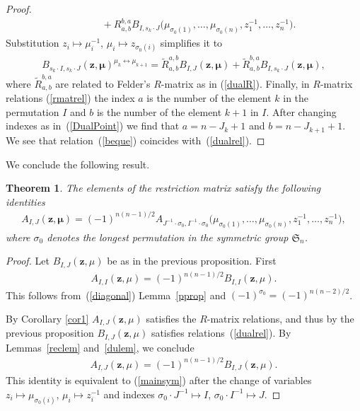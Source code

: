 \documentclass[pdftex]{sigma}
\def\zz{{\boldsymbol z}}
\def\mub{{\boldsymbol\mu}}
\numberwithin{equation}{section}
\newtheorem{Theorem}{Theorem}[section]
\begin{document}
\begin{proof}
\begin{gather*}
 \qquad\quad{}+R^{b,a}_{a,b} B_{I,s_k \cdot J}\big(\mu_{\sigma_{0}(1)},\dots,\mu_{\sigma_{0}(n)},z_{1}^{-1},\dots, z_{n}^{-1}\big).
\end{gather*}
Substitution $z_{i} \mapsto \mu_{i}^{-1}$, $\mu_{i} \mapsto z_{\sigma_{0}(i)}$ simplifies it to
\begin{gather} \label{beque}
B_{s_k \cdot I ,s_k\cdot J }(\zz,\mub)^{\mu_{k}\leftrightarrow \mu_{k+1}}=\tilde{R}^{a,b}_{a,b} B_{I,J}(\zz,\mub)+\tilde{R}^{b,a}_{a,b} B_{I,s_k \cdot J}(\zz,\mub),
\end{gather}
where $\tilde{R}^{b,a}_{a,b}$ are related to Felder's $R$-matrix as in (\ref{dualR}). Finally, in $R$-matrix relations (\ref{rmatrel}) the index $a$ is the number of the element $k$ in the permutation $I$ and $b$ is the number of the element $k+1$ in $I$. After changing indexes as in~(\ref{DualPoint}) we find that $a=n-J_k+1$ and $b=n-J_{k+1}+1$. We see that relation~(\ref{beque}) coincides with~(\ref{dualrel}).
\end{proof}

We conclude the following result.
\begin{Theorem} \label{duthrm} The elements of the restriction matrix satisfy the following identities
\begin{gather} \label{mainsym}
A_{I,J}(\zz,\mub)=(-1)^{n(n-1)/2} A_{J^{-1}\cdot \sigma_{0},I^{-1}\cdot \sigma_{0}}\big(\mu_{\sigma_{0}(1)},\dots,\mu_{\sigma_{0}(n)},z^{-1}_1,\dots, z_{n}^{-1}\big),
\end{gather}
where $\sigma_{0}$ denotes the longest permutation in the symmetric group $\mathfrak{S}_{n}$.
\end{Theorem}

\begin{proof}Let $B_{I,J}(\zz,\mu)$ be as in the previous proposition. First \begin{gather*} A_{I,I}(\zz,\mu)=(-1)^{n(n-1)/2} B_{I,I}(\zz,\mu).\end{gather*} This follows from~(\ref{diagonal}) Lemma~\ref{pprop} and $(-1)^{\sigma_{0}}=(-1)^{n(n-2)/2}$.

By Corollary \ref{cor1} $A_{I,J}(\zz,\mu)$ satisfies the $R$-matrix relations, and thus by the previous proposition $B_{I,J}(\zz,\mu)$ satisfies relations~(\ref{dualrel}).
By Lemmas~\ref{reclem} and~\ref{dulem}, we conclude
\begin{gather*}
A_{I,J}(\zz,\mu)=(-1)^{n(n-1)/2} B_{I,J}(\zz,\mu).
\end{gather*}
This identity is equivalent to (\ref{mainsym}) after the change of variables $z_{i}\mapsto \mu_{\sigma_{0}(i)}$, $\mu_{i}\mapsto z_i^{-1}$ and indexes $\sigma_{0}\cdot J^{-1}\mapsto I$, $\sigma_{0}\cdot I^{-1}\mapsto J$.
\end{proof}
\end{document}
